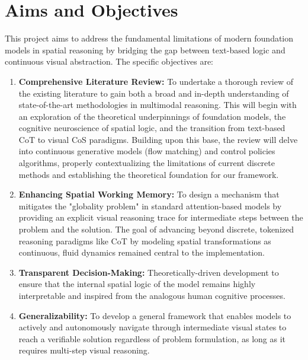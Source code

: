 \documentclass{l4proj}
\begin{document}
\section{Aims and Objectives}
This project aims to address the fundamental limitations of modern foundation models in spatial reasoning by bridging the gap between text-based logic and continuous visual abstraction. The specific objectives are:
\begin{enumerate}
    \item \textbf{Comprehensive Literature Review:} To undertake a thorough review of the existing literature to gain both a broad and in-depth understanding of state-of-the-art methodologies in multimodal reasoning. This will begin with an exploration of the theoretical underpinnings of foundation models, the cognitive neuroscience of spatial logic, and the transition from text-based CoT to visual CoS paradigms. Building upon this base, the review will delve into continuous generative models (flow matching) and control policies algorithms, properly contextualizing the limitations of current discrete methods and establishing the theoretical foundation for our framework.
    \item \textbf{Enhancing Spatial Working Memory:} To design a mechanism that mitigates the "globality problem" in standard attention-based models by providing an explicit visual reasoning trace for intermediate steps between the problem and the solution. The goal of advancing beyond discrete, tokenized reasoning paradigms like CoT by modeling spatial transformations as continuous, fluid dynamics remained central to the implementation.
    \item \textbf{Transparent Decision-Making:} Theoretically-driven development to ensure that the internal spatial logic of the model remains highly interpretable and inspired from the analogous human cognitive processes.
    \item \textbf{Generalizability:} To develop a general framework that enables models to actively and autonomously navigate through intermediate visual states to reach a verifiable solution regardless of problem formulation, as long as it requires multi-step visual reasoning.
\end{enumerate}
\end{document}
